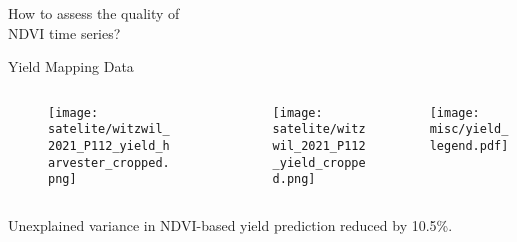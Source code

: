 \begin{frame}
	\centering
	\huge
	How to assess the quality of \\
	NDVI time series?
\end{frame}

\begin{frame}{Yield Mapping Data}
	\begin{columns}
		
		\begin{column}{0.42\textwidth}
			\begin{figure}
				\texttt{[image: satelite/witzwil\_2021\_P112\_yield\_harvester\_cropped.png]}
			\end{figure}
		\end{column}
		\begin{column}{0.42\textwidth}
			\begin{figure}
				\texttt{[image: satelite/witzwil\_2021\_P112\_yield\_cropped.png]}
			\end{figure}
		\end{column}
		\begin{column}{0.14\textwidth}
			\texttt{[image: misc/yield\_legend.pdf]}
		\end{column}		
	\end{columns}

\end{frame}

\begin{frame}
	\huge
	\centering
	Unexplained variance in NDVI-based yield prediction reduced by 10.5\%.
\end{frame}
